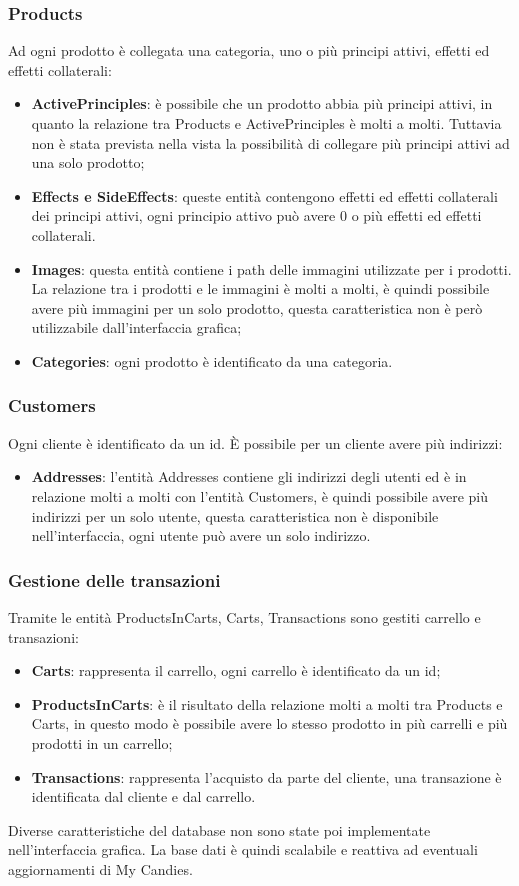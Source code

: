 \subsubsection{Products} Ad ogni prodotto è collegata una categoria, uno o più principi attivi, effetti ed effetti collaterali:  \begin{itemize}
    \item[] \textbf{ActivePrinciples}: è possibile che un prodotto abbia più principi attivi, in quanto la relazione tra Products e ActivePrinciples è molti a molti. Tuttavia non è stata prevista nella vista la possibilità di collegare più principi attivi ad una solo prodotto;
    \item[] \textbf{Effects e SideEffects}: queste entità contengono effetti ed effetti collaterali dei principi attivi, ogni principio attivo può avere 0 o più effetti ed effetti collaterali.
    \item[] \textbf{Images}: questa entità contiene i path delle immagini utilizzate per i prodotti. La relazione tra i prodotti e le immagini è molti a molti, è quindi possibile avere più immagini per un solo prodotto, questa caratteristica non è però utilizzabile dall'interfaccia grafica;
    \item[] \textbf{Categories}: ogni prodotto è identificato da una categoria.
\end{itemize}
\subsubsection{Customers} Ogni cliente è identificato da un id. È possibile per un cliente avere più indirizzi:
 \begin{itemize}
    \item[] \textbf{Addresses}: l'entità Addresses contiene gli indirizzi degli utenti ed è in relazione molti a molti con l'entità Customers, è quindi possibile avere più indirizzi per un solo utente, questa caratteristica non è disponibile nell'interfaccia, ogni utente può avere un solo indirizzo.
\end{itemize}
\subsubsection{Gestione delle transazioni} Tramite le entità ProductsInCarts, Carts, Transactions sono gestiti carrello e transazioni:
\begin{itemize}
    \item[] \textbf{Carts}: rappresenta il carrello, ogni carrello è identificato da un id;
     \item[] \textbf{ProductsInCarts}: è il risultato della relazione molti a molti tra Products e Carts, in questo modo è possibile avere lo stesso prodotto in più carrelli e più prodotti in un carrello;
    \item[] \textbf{Transactions}: rappresenta l'acquisto da parte del cliente, una transazione è identificata dal cliente e dal carrello.
\end{itemize}
Diverse caratteristiche del database non sono state poi implementate nell'interfaccia grafica. La base dati è quindi scalabile e reattiva ad eventuali aggiornamenti di My Candies.

